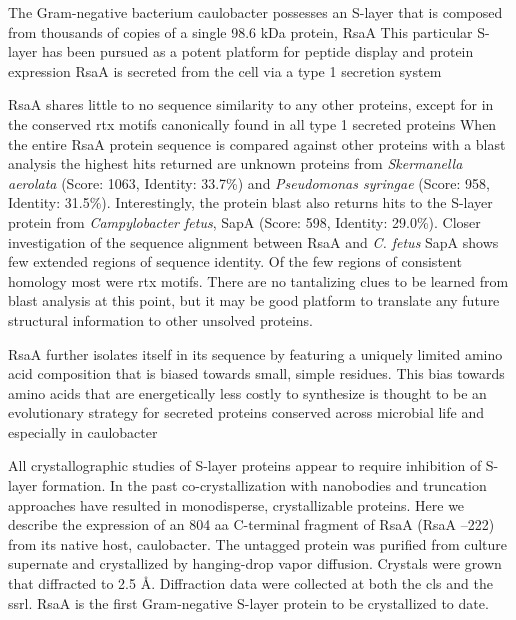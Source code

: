 The Gram-negative bacterium \acl{caulobacter} possesses an
\ac{S-layer} that is composed from thousands of copies of a single 98.6 kDa protein, RsaA
 This particular \ac{S-layer} has been pursued as a potent platform for peptide display and
protein expression
RsaA is secreted from the cell via a type 1
secretion system

 RsaA shares little to no sequence similarity to any
other proteins, except for in the conserved \ac{rtx}
motifs canonically found in all type 1 secreted
proteins When the entire RsaA protein
sequence is compared against other proteins with a \ac{blast} analysis the
highest hits returned are unknown proteins from \textit{Skermanella aerolata}
(Score: 1063, Identity: 33.7\%) and \textit{Pseudomonas syringae} (Score: 958,
Identity: 31.5\%). Interestingly, the protein \ac{blast} also returns hits to
the \ac{S-layer} protein from \textit{Campylobacter fetus}, SapA (Score: 598,
Identity: 29.0\%). Closer investigation of the sequence alignment between RsaA
and \textit{C. fetus} SapA shows few extended regions of sequence identity. 
Of the few regions of consistent homology most were \ac{rtx} motifs. There are
no tantalizing clues to be learned from \ac{blast} analysis at this point, but it
may be good platform to translate any future structural information to other
unsolved proteins.

 RsaA further isolates itself in its sequence by featuring a uniquely limited amino
acid composition that is biased towards small, simple residues. This bias
towards  amino acids that are energetically less costly to synthesize is thought to be an evolutionary strategy
for secreted proteins conserved across microbial life and especially in
\ac{caulobacter}

All crystallographic studies of \ac{S-layer} proteins appear to require inhibition of \ac{S-layer} formation. In the
past co-crystallization with nanobodies
 and truncation
 approaches have resulted in monodisperse, crystallizable proteins. Here we describe the
expression of an 804 \ac{aa} C-terminal fragment of RsaA (RsaA --222) from
its native host, \ac{caulobacter}. The untagged protein was purified
from culture supernate and crystallized by hanging-drop vapor
diffusion. Crystals were grown that diffracted to 2.5 \AA.
Diffraction data were collected at both the \ac{cls} 
and the \ac{ssrl}. RsaA is the first Gram-negative \ac{S-layer} protein to be
crystallized to date.

